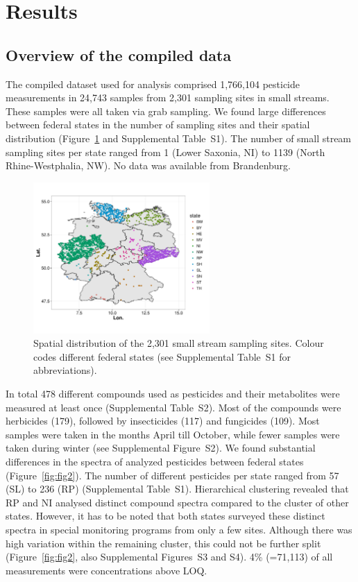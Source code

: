 \documentclass[journal=esthag,manuscript=article]{achemso}
\begin{document}
\section{Results}
\subsection{Overview of the compiled data}

The compiled dataset used for analysis comprised 1,766,104 pesticide measurements in 24,743 samples from 2,301 sampling sites in small streams.  %
These samples were all taken via grab sampling.  
We found large differences between federal states in the number of sampling sites and their spatial distribution (Figure~\ref{fig:fig1} and Supplemental Table~S1). 
The number of small stream sampling sites per state ranged from 1 (Lower Saxonia, NI) to 1139 (North Rhine-Westphalia, NW).
No data was available from Brandenburg. 

\begin{figure}[ht]
  \includegraphics[width=0.6\textwidth]{figure1.pdf}
  \caption{Spatial distribution of the 2,301 small stream sampling sites. Colour codes different federal states (see Supplemental Table~S1 for abbreviations).}
  \label{fig:fig1}
\end{figure}

In total 478 different compounds used as pesticides and their metabolites were measured at least once (Supplemental Table~S2). 
Most of the compounds were herbicides (179), followed by insecticides (117) and fungicides (109). %
Most samples were taken in the months April till October, while fewer samples were taken during winter (see Supplemental Figure~S2).
We found substantial differences in the spectra of analyzed pesticides between federal states (Figure~\ref{fig:fig2}).
The number of different pesticides per state ranged from 57 (SL) to 236 (RP) (Supplemental Table~S1). 
Hierarchical clustering revealed that RP and NI analysed distinct compound spectra compared to the cluster of other states. 
However, it has to be noted that both states surveyed these distinct spectra in special monitoring programs from only a few sites. 
Although there was high variation within the remaining cluster, this could not be further split (Figure~\ref{fig:fig2}, also Supplemental Figures~S3 and S4).
4\% (=71,113) of all measurements were concentrations above LOQ.
\end{document}
